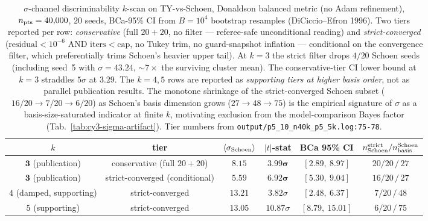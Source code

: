 \begin{table}[t]
\centering
\caption{$\sigma$-channel discriminability $k$-scan on TY-vs-Schoen, Donaldson balanced metric (no Adam refinement), $n_{\rm pts}=40{,}000$, $20$ seeds, BCa-95\% CI from $B=10^4$ bootstrap resamples (DiCiccio--Efron 1996). Two tiers reported per row: \emph{conservative} (full $20{+}20$, no filter — referee-safe unconditional reading) and \emph{strict-converged} ($\mathrm{residual}<10^{-6}$ AND $\mathrm{iters}<\mathrm{cap}$, no Tukey trim, no guard-snapshot inflation — conditional on the convergence filter, which preferentially trims Schoen's heavier upper tail). At $k=3$ the strict filter drops $4/20$ Schoen seeds (including seed~5 with $\sigma=43.24$, $\sim 7\times$ the surviving cluster mean). The conservative-tier CI lower bound at $k=3$ straddles $5\sigma$ at $3.29$. The $k=4,5$ rows are reported as \emph{supporting tiers at higher basis order}, not as parallel publication results. The monotone shrinkage of the strict-converged Schoen subset ($16/20 \to 7/20 \to 6/20$) as Schoen's basis dimension grows ($27 \to 48 \to 75$) is the empirical signature of $\sigma$ as a basis-size-saturated indicator at finite $k$, motivating exclusion from the model-comparison Bayes factor (Tab.~\ref{tab:cy3-sigma-artifact}). Tier numbers from \texttt{output/p5\_10\_n40k\_p5\_5k.log:75-78}.}
\label{tab:cy3-sigma-kscan}
\begin{ruledtabular}
\begin{tabular}{cccccc}
$k$ & tier & $\langle\sigma_{\rm Schoen}\rangle$ & $|t|$-stat & BCa 95\% CI & $n_{\rm Schoen}^{\rm strict}/n_{\rm basis}^{\rm Schoen}$ \\
\hline
$\mathbf{3}$ (publication) & conservative (full $20{+}20$) & $8.15$ & $\mathbf{3.99\sigma}$ & $[2.89,\ 8.97]$ & $20/20\,/\,27$ \\
$\mathbf{3}$ (publication) & strict-converged (conditional) & $5.59$ & $\mathbf{6.92\sigma}$ & $\mathbf{[5.30,\ 9.04]}$ & $16/20\,/\,27$ \\
$4$ (damped, supporting)   & strict-converged & $13.21$ & $3.82\sigma$ & $[2.48,\ 6.37]$ & $7/20\,/\,48$ \\
$5$ (supporting)           & strict-converged & $13.05$ & $10.87\sigma$ & $[8.79,\ 15.01]$ & $6/20\,/\,75$ \\
\end{tabular}
\end{ruledtabular}
\end{table}
